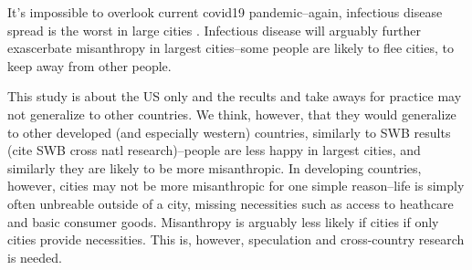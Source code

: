 \documentclass[10pt, letterpaper]{article}
\begin{document}
\begin{spacing}{1.4}
It's impossible to overlook current covid19 pandemic--again, infectious disease
spread is the worst in large cities \cite{bettencourt10}. %
 Infectious disease will arguably further exascerbate misanthropy in largest
 cities--some people are likely to flee cities, to keep away from other people.



This study is about the US only and the recults and take aways for practice may
not generalize to other countries. We think, however, that they would generalize
to other developed (and especially western) countries, similarly to SWB results
(cite SWB cross natl research)--people are less happy in largest cities, and
similarly they are likely to be more misanthropic.
%
In developing countries, however, cities may not be more misanthropic for one simple
reason--life is simply often unbreable outside of a city, missing necessities such as access to
heathcare and basic consumer goods. Misanthropy is arguably less likely if cities if
only cities provide necessities. This is, however, speculation and cross-country 
research is needed.



\end{spacing}
\end{document}
